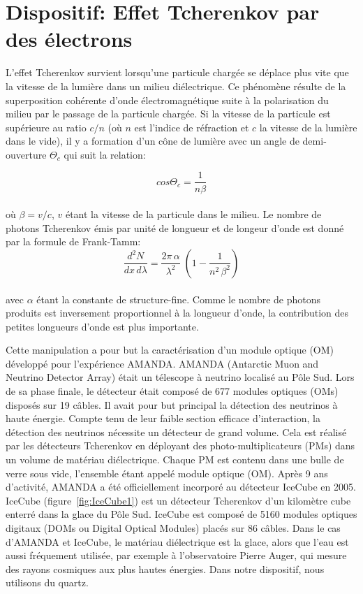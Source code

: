 \section{Dispositif: Effet Tcherenkov par des électrons}
\label{sect:Tcherenkov_electron}

L'effet Tcherenkov survient lorsqu'une particule chargée se déplace plus vite que la vitesse de la lumière dans un milieu diélectrique. Ce phénomène résulte de la superposition cohérente d'onde électromagnétique suite à la polarisation du milieu par le passage de la particule chargée. Si la vitesse de la particule est supérieure au ratio $c/n$ (où $n$ est l'indice de réfraction et $c$ la vitesse de la lumière dans le vide), il y a formation d'un cône de lumière avec un angle de demi-ouverture $\Theta_c$ qui suit la relation:

\begin{equation}
    cos\Theta_c = \frac{1}{n\beta}
\end{equation}\\
où $\beta = v/c$, $v$ étant la vitesse de la particule dans le milieu. Le nombre de photons Tcherenkov émis par unité de longueur et de longeur d'onde est donné par la formule de Frank-Tamm:
\begin{equation}
     \frac{d^2N}{dx \, d\lambda} = \frac{2\pi \, \alpha}{\lambda^2} \; (1- \frac{1}{n^2 \, \beta^2} )
\end{equation}\\
avec $\alpha$ étant la constante de structure-fine. Comme le nombre de photons produits est inversement proportionnel à la longueur d'onde, la contribution des petites longueurs d'onde est plus importante.

Cette manipulation a pour but la caractérisation d'un module optique (OM) développé pour l'expérience AMANDA. AMANDA (Antarctic Muon and Neutrino Detector Array) était  un télescope à neutrino localisé au Pôle Sud. Lors de sa phase finale, le détecteur était composé de 677 modules optiques (OMs) disposés sur 19 câbles. Il avait pour but principal la détection des neutrinos à haute énergie. Compte tenu de leur faible section efficace d'interaction, la détection des neutrinos nécessite un détecteur de grand volume. Cela est réalisé par les détecteurs Tcherenkov en déployant des photo-multiplicateurs (PMs) dans un volume de matériau diélectrique. Chaque PM est contenu dans une bulle de verre sous vide, l'ensemble étant appelé module optique (OM). Après 9 ans d'activité, AMANDA a été officiellement incorporé au détecteur IceCube en 2005. IceCube (figure~\ref{fig:IceCube1}) est un détecteur Tcherenkov d'un kilomètre cube enterré dans la glace du Pôle Sud. IceCube est composé de 5160 modules optiques digitaux (DOMs ou Digital Optical Modules) placés sur 86 câbles. Dans le cas d'AMANDA et IceCube, le matériau diélectrique est la glace, alors que l’eau est aussi fréquement utilisée, par exemple à l'observatoire Pierre Auger, qui mesure des rayons cosmiques aux plus hautes énergies. Dans notre dispositif, nous utilisons du quartz.

